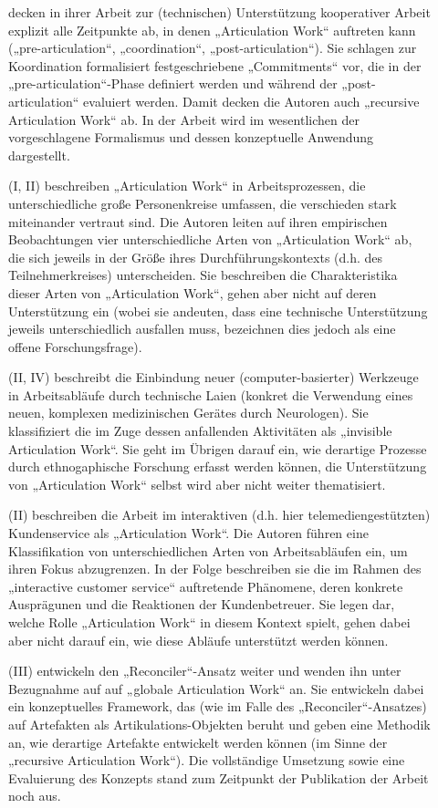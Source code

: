 \begin{description}
	\item[\citet{Raposo04}] decken in ihrer Arbeit zur (technischen) Unterstützung kooperativer Arbeit explizit alle Zeitpunkte ab, in denen „Articulation Work“ auftreten kann („pre-articulation“, „coordination“, „post-articulation“). Sie schlagen zur Koordination formalisiert festgeschriebene „Commitments“ vor, die in der „pre-articulation“-Phase definiert werden und während der „post-articulation“ evaluiert werden. Damit decken die Autoren auch „recursive Articulation Work“ \citep{Sarini02} ab. In der Arbeit wird im wesentlichen der vorgeschlagene Formalismus und dessen konzeptuelle Anwendung dargestellt.
	\item[\citet{Faergemann05}] (I, II) beschreiben „Articulation Work“ in Arbeitsprozessen, die unterschiedliche große Personenkreise umfassen, die verschieden stark miteinander vertraut sind. Die Autoren leiten auf ihren empirischen Beobachtungen vier unterschiedliche Arten von „Articulation Work“ ab, die sich jeweils in der Größe ihres Durchführungskontexts (d.h. des Teilnehmerkreises) unterscheiden. Sie beschreiben die Charakteristika dieser Arten von „Articulation Work“, gehen aber nicht auf deren Unterstützung ein (wobei sie andeuten, dass eine technische Unterstützung jeweils unterschiedlich ausfallen muss, bezeichnen dies jedoch als eine offene Forschungsfrage).
	\item[\citet{Hasu05}] (II, IV) beschreibt die Einbindung neuer (computer-basierter) Werkzeuge in Arbeitsabläufe durch technische Laien (konkret die Verwendung eines neuen, komplexen medizinischen Gerätes durch Neurologen). Sie klassifiziert die im Zuge dessen anfallenden Aktivitäten als „invisible Articulation Work“. Sie geht im Übrigen darauf ein, wie derartige Prozesse durch ethnogaphische Forschung erfasst werden können, die Unterstützung von „Articulation Work“ selbst wird aber nicht weiter thematisiert.
	\item[\citet{Hampson05}] (II) beschreiben die Arbeit im interaktiven (d.h. hier telemediengestützten) Kundenservice als „Articulation Work“. Die Autoren führen eine Klassifikation von unterschiedlichen Arten von Arbeitsabläufen ein, um ihren Fokus abzugrenzen. In der Folge beschreiben sie die im Rahmen des „interactive customer service“ auftretende Phänomene, deren konkrete Ausprägunen und die Reaktionen der Kundenbetreuer. Sie legen dar, welche Rolle „Articulation Work“ in diesem Kontext spielt, gehen dabei aber nicht darauf ein, wie diese Abläufe unterstützt werden können. 
	\item[\citet{Cabitza06}] (III) entwickeln den „Reconciler“-Ansatz weiter und wenden ihn unter Bezugnahme auf \citet{Faergemann05} auf „globale Articulation Work“ an. Sie entwickeln dabei ein konzeptuelles Framework, das (wie im Falle des „Reconciler“-Ansatzes) auf Artefakten als Artikulations-Objekten beruht und geben eine Methodik an, wie derartige Artefakte entwickelt werden können (im Sinne der „recursive Articulation Work“). Die vollständige Umsetzung sowie eine Evaluierung des Konzepts stand zum Zeitpunkt der Publikation der Arbeit noch aus. 

\end{description}
